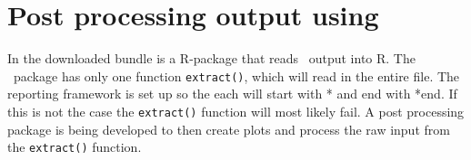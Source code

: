 \section{Post processing output using \R \label{sec:post-processing}}
In the downloaded bundle is a R-package that reads \CNAME\ output into R. The \CNAME\ package has only one function \texttt{extract()}, which will read in the entire file. The reporting framework is set up so the each  will start with * and end with *end. If this is not the case the \texttt{extract()} function will most likely fail. A post processing package is being developed to then create plots and process the raw input from the \texttt{extract()} function.